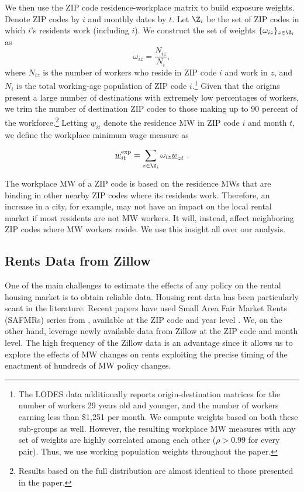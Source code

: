 We then use the ZIP code residence-workplace matrix to build exposure weights. Denote 
ZIP codes by $i$ and monthly dates by $t$. Let $\Z_i$ be the set of ZIP codes in 
which $i$'s residents work (including $i$). We construct the set of weights 
$\{\omega_{iz}\}_{z \in \Z_i}$ as $$\omega_{iz} = \frac{N_{iz}}{N_i} , $$ where 
$N_{iz}$ is the number of workers who reside in ZIP code $i$ and work in $z$, and $N_i$ 
is the total working-age population of ZIP code $i$.\footnote{The LODES data additionally 
	reports origin-destination matrices for the number of workers 29 years old and younger,  
	and the number of workers earning less than \$1,251 per month. We compute weights based 
	on both these sub-groups as well. However, the resulting workplace MW measures with
	any set of weights are highly correlated among each other ($\rho>0.99$ for every pair).
	Thus, we use working population weights throughout the paper.} 
Given that the origins present a large number of destinations with extremely low percentages of 
workers, we trim the number of destination ZIP codes to those making up to 90 percent of the 
workforce.\footnote{Results based on the full distribution are almost identical to those presented
	in the paper.} 
Letting $\underline{w}_{it}$ denote the residence MW in ZIP code $i$ and month $t$, we 
define the workplace minimum wage measure as

\begin{equation}
\underline{w}^{\text{exp}}_{it} = 
\sum_{z \in \Z_i} \omega_{iz} \underline{w}_{zt} \ . 
\end{equation}

The workplace MW of a ZIP code is based on the residence MWs that are binding in 
other nearby ZIP codes where its residents work. Therefore, an increase in a 
city, for example, may not have an impact on the local rental market if most 
residents are not MW workers. It will, instead, affect neighboring ZIP codes 
where MW workers reside. We use this insight all over our analysis. 

\subsection{Rents Data from Zillow}

One of the main challenges to estimate the effects of any policy on the rental housing market
is to obtain reliable data. Housing rent data has been particularly scant in the 
literature. Recent papers have used Small Area Fair Market Rents (SAFMRs) series from 
\textcite{hud}, available at the ZIP code and year level \parencite{Tidemann2018, 
Yamagishi2019}. We, on the other hand, leverage newly available data from Zillow at the 
ZIP code and month level. The high frequency of the Zillow data is an advantage since it 
allows us to explore the effects of MW changes on rents exploiting the precise timing of 
the enactment of hundreds of MW policy changes.

